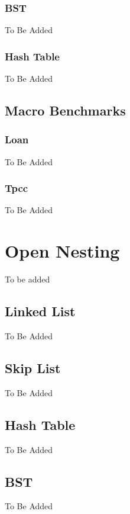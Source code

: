 \documentclass[12pt,english]{report}
\begin{document}
\subsubsection{BST}
To Be Added

\subsubsection{Hash Table}
To Be Added 

\subsection{Macro Benchmarks}

\subsubsection{Loan}

To Be Added

\subsubsection{Tpcc}

To Be Added

\section{Open Nesting}

To be added

\subsection{Linked List}

To Be Added 

\subsection{Skip List}

To Be Added 

\subsection{Hash Table}

To Be Added 

\subsection{BST}

To Be Added
\end{document}
